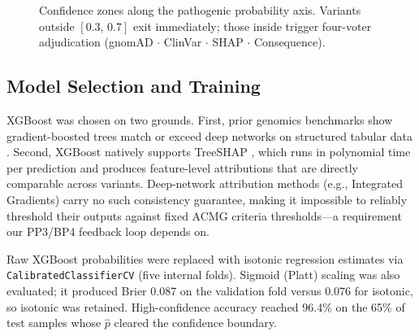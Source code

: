 \documentclass[12pt,a4paper]{article}
\begin{document}
\begin{figure}[htbp]
\centering
{}
\caption{Confidence zones along the pathogenic probability axis.
         Variants outside $[0.3,\,0.7]$ exit immediately; those
         inside trigger four-voter adjudication
         (gnomAD $\cdot$ ClinVar $\cdot$ SHAP $\cdot$ Consequence).}
\label{fig:confzones}
\end{figure}

\subsection{Model Selection and Training}

XGBoost \citep{chen2016xgboost} was chosen on two grounds. First,
prior genomics benchmarks show gradient-boosted trees match or
exceed deep networks on structured tabular data \citep{parente2021}.
Second, XGBoost natively supports TreeSHAP \citep{lundberg2020trees},
which runs in polynomial time per prediction and produces
feature-level attributions that are directly comparable across
variants. Deep-network attribution methods (e.g., Integrated
Gradients) carry no such consistency guarantee, making it
impossible to reliably threshold their outputs against fixed ACMG
criteria thresholds---a requirement our PP3/BP4 feedback loop
depends on.

Raw XGBoost probabilities were replaced with isotonic regression
estimates via \texttt{CalibratedClassifierCV} (five internal folds).
Sigmoid (Platt) scaling was also evaluated; it produced Brier 0.087
on the validation fold versus 0.076 for isotonic, so isotonic was
retained. High-confidence accuracy reached 96.4\% on the 65\% of
test samples whose $\hat{p}$ cleared the confidence boundary.
\end{document}
